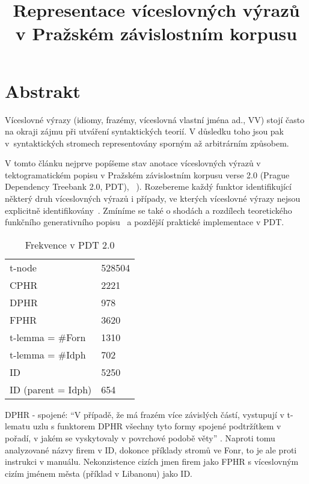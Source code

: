 \documentclass[12pt]{article}
\title{Representace víceslovných výrazů\\ v Pražském závislostním korpusu}
\date{}                                           %
\begin{document}
\maketitle
\thispagestyle{empty} %

\section*{Abstrakt}
Víceslovné výrazy (idiomy, frazémy, víceslovná vlastní jména ad., VV) stojí často na okraji zájmu při utváření syntaktických teorií. V důsledku toho jsou pak v~syntaktických stromech representovány sporným až arbitrárním způsobem.

V tomto článku nejprve popíšeme stav anotace víceslovných výrazů v tektogramatickém popisu v Pražském závislostním korpusu verse 2.0 (Prague Dependency Treebank 2.0, PDT), ~\citep{hajic:2005}). Rozebereme každý funktor identifikující některý druh víceslovných výrazů i případy, ve kterých víceslovné výrazy nejsou explicitně identifikovány~\citep{mikulova:2006}. Zmíníme se také o shodách a rozdílech teoretického funkčního generativního popisu~\citep{sgall-etal:1986} a pozdější praktické implementace v PDT.
\begin{table}[htdp]
\begin{center}
\begin{tabular}{|l|l|}
\hline
t-node & 528504 \\
CPHR & 2221\\
DPHR & 978 \\
FPHR & 3620 \\
t-lemma = \#Forn & 1310 \\
t-lemma = \#Idph & 702 \\
ID & 5250 \\
ID (parent = Idph) & 654 \\
\hline
\end{tabular}
\caption{Frekvence v PDT 2.0}
\end{center}
\label{default}
\end{table}%

DPHR - spojené: ``V případě, že má frazém více závislých částí, vystupují v t-lematu uzlu s funktorem DPHR všechny tyto formy spojené podtržítkem v pořadí, v jakém se vyskytovaly v povrchové podobě věty'' \citep{mikulova:2006}. Naproti tomu analyzované názvy firem v ID, dokonce příklady stromů ve Fonr, to je ale proti instrukci v manuálu. Nekonzistence cizích jmen firem jako FPHR  s víceslovným cizím jménem města (příklad v Libanonu) jako ID.
\end{document}
